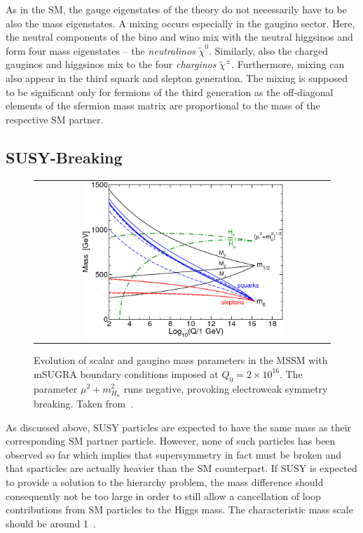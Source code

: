 As in the SM, the gauge eigenstates of the theory do not necessarily have to be also the mass eigenstates. A mixing occurs especially in the gaugino sector. Here, the neutral components of the bino and wino mix with the neutral higgsinos and form four mass eigenstates -- the \textit{neutralinos} $\tilde{\chi}^0$. Similarly, also the charged gauginos and higgsinos mix to the four \textit{charginos} $\tilde{\chi}^{\pm}$. Furthermore, mixing can also appear in the third squark and slepton generation. The mixing is supposed to be significant only for fermions of the third generation as the off-diagonal elements of the sfermion mass matrix are proportional to the mass of the respective SM partner. 

\subsection{SUSY-Breaking}
\label{subsec:susy_breaking}
\begin{figure}[!tp]
  \centering 
  \begin{tabular}{c}
    \includegraphics[width=0.7\textwidth]{figures/MSSMrun.png}
  \end{tabular}
  \caption{Evolution of scalar and gaugino mass parameters in the MSSM with mSUGRA boundary conditions imposed at $Q_0 = 2 \times 10^{16}$\gev. The parameter $\mu^2 + m^2_{H_{u}}$ runs negative, provoking electroweak symmetry breaking. Taken from~\cite{Martin:1997ns}.}
  \label{fig:MSSMrun}
\end{figure}
As discussed above, SUSY particles are expected to have the same mass as their corresponding SM partner particle. However, none of such particles has been observed so far which implies that supersymmetry in fact must be broken and that sparticles are actually heavier than the SM counterpart. If SUSY is expected to provide a solution to the hierarchy problem, the mass difference should consequently not be too large in order to still allow a cancellation of loop contributions from SM particles to the Higgs mass. The characteristic mass scale should be around 1\tev~\cite{Martin:1997ns}. \\
